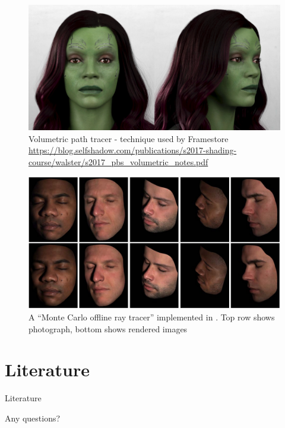 \documentclass{f4_beamer_metropolis}
\begin{document}
\begin{frame}[plain]
  \begin{figure}
    \includegraphics[scale=0.275,keepaspectratio]{./images/framestore-digital-gamora.jpg}
    \caption{Volumetric path tracer - technique used by  Framestore \url{https://blog.selfshadow.com/publications/s2017-shading-course/walster/s2017_pbs_volumetric_notes.pdf}}
  \end{figure}

\end{frame}

\begin{frame}[plain]
  \begin{figure}
    \includegraphics[scale=0.275,keepaspectratio]{./images/monte-carlo-ray-tracer.jpg}
    \caption{A \enquote{Monte Carlo offline ray tracer} implemented in \citet{weyrich2006analysis}. Top row shows photograph, bottom shows rendered images}
  \end{figure}
\end{frame}

\section{Literature}

\begin{frame}[allowframebreaks]{Literature}
  \printbibliography
\end{frame}

\begin{frame}[standout]
  Any questions?
\end{frame}
\end{document}
